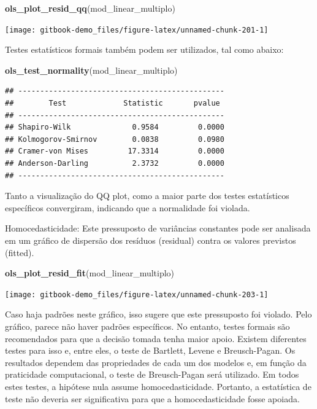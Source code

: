 \documentclass[
]{book}
\newenvironment{Shaded}{\begin{snugshade}}{\end{snugshade}}
\newcommand{\KeywordTok}[1]{\textcolor[rgb]{0.13,0.29,0.53}{\textbf{#1}}}
\newcommand{\NormalTok}[1]{#1}
\begin{document}
\begin{Shaded}
\begin{Highlighting}[]
\KeywordTok{ols_plot_resid_qq}\NormalTok{(mod_linear_multiplo)}
\end{Highlighting}
\end{Shaded}

\begin{center}\texttt{[image: gitbook-demo\_files/figure-latex/unnamed-chunk-201-1]} \end{center}

Testes estatísticos formais também podem ser utilizados, tal como abaixo:

\begin{Shaded}
\begin{Highlighting}[]
\KeywordTok{ols_test_normality}\NormalTok{(mod_linear_multiplo)}
\end{Highlighting}
\end{Shaded}

\begin{verbatim}
## -----------------------------------------------
##        Test             Statistic       pvalue  
## -----------------------------------------------
## Shapiro-Wilk              0.9584         0.0000 
## Kolmogorov-Smirnov        0.0838         0.0980 
## Cramer-von Mises         17.3314         0.0000 
## Anderson-Darling          2.3732         0.0000 
## -----------------------------------------------
\end{verbatim}

Tanto a visualização do QQ plot, como a maior parte dos testes estatísticos específicos convergiram, indicando que a normalidade foi violada.

Homocedasticidade: Este pressuposto de variâncias constantes pode ser analisada em um gráfico de dispersão dos resíduos (residual) contra os valores previstos (fitted).

\begin{Shaded}
\begin{Highlighting}[]
\KeywordTok{ols_plot_resid_fit}\NormalTok{(mod_linear_multiplo)}
\end{Highlighting}
\end{Shaded}

\begin{center}\texttt{[image: gitbook-demo\_files/figure-latex/unnamed-chunk-203-1]} \end{center}

Caso haja padrões neste gráfico, isso sugere que este pressuposto foi violado. Pelo gráfico, parece não haver padrões específicos. No entanto, testes formais são recomendados para que a decisão tomada tenha maior apoio. Existem diferentes testes para isso e, entre eles, o teste de Bartlett, Levene e Breusch-Pagan. Os resultados dependem das propriedades de cada um dos modelos e, em função da praticidade computacional, o teste de Breusch-Pagan será utilizado. Em todos estes testes, a hipótese nula assume homocedasticidade. Portanto, a estatística de teste não deveria ser significativa para que a homocedasticidade fosse apoiada.
\end{document}
